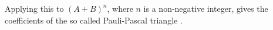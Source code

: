 \documentclass[12pt,reqno]{amsart}
\begin{document}
Applying this to $(A+B)^n$, where $n$ is a non-negative integer, gives the coefficients of the so called Pauli-Pascal triangle \cite{horn,sloane}.



\end{document}
